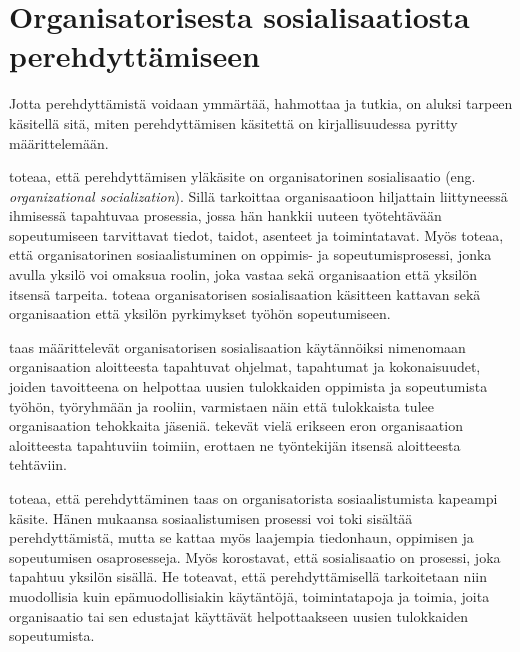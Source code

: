 \documentclass[utf8]{gradu3}
\begin{document}
\section{Organisatorisesta sosialisaatiosta perehdyttämiseen}

Jotta perehdyttämistä voidaan ymmärtää, hahmottaa ja tutkia, on aluksi tarpeen käsitellä sitä, miten perehdyttämisen käsitettä on kirjallisuudessa pyritty määrittelemään.

\textcite{wanberg-2012} toteaa, että perehdyttämisen yläkäsite on organisatorinen sosialisaatio (eng. \textit{organizational socialization}). Sillä \textcite{wanberg-2012} tarkoittaa organisaatioon hiljattain liittyneessä ihmisessä tapahtuvaa prosessia, jossa hän hankkii uuteen työtehtävään sopeutumiseen tarvittavat tiedot, taidot, asenteet ja toimintatavat. Myös \textcite{chao-2012} toteaa, että organisatorinen sosiaalistuminen on oppimis- ja sopeutumisprosessi, jonka avulla yksilö voi omaksua roolin, joka vastaa sekä organisaation että yksilön itsensä tarpeita. \textcite{chao-2012} toteaa organisatorisen sosialisaation käsitteen kattavan sekä organisaation että yksilön pyrkimykset työhön sopeutumiseen.

\textcite{saks-gruman-2012} taas määrittelevät organisatorisen sosialisaation käytännöiksi nimenomaan organisaation aloitteesta tapahtuvat ohjelmat, tapahtumat ja kokonaisuudet, joiden tavoitteena on helpottaa uusien tulokkaiden oppimista ja sopeutumista työhön, työryhmään ja rooliin, varmistaen näin että tulokkaista tulee organisaation tehokkaita jäseniä. \textcite{saks-gruman-2012} tekevät vielä erikseen eron organisaation aloitteesta tapahtuviin toimiin, erottaen ne työntekijän itsensä aloitteesta tehtäviin.

\textcite{wanberg-2012} toteaa, että perehdyttäminen taas on organisatorista sosiaalistumista kapeampi käsite. Hänen mukaansa sosiaalistumisen prosessi voi toki sisältää perehdyttämistä, mutta se kattaa myös laajempia tiedonhaun, oppimisen ja sopeutumisen osaprosesseja. Myös \textcite{klein-polin-2012} korostavat, että sosialisaatio on prosessi, joka tapahtuu yksilön sisällä. He toteavat, että perehdyttämisellä tarkoitetaan niin muodollisia kuin epämuodollisiakin käytäntöjä, toimintatapoja ja toimia, joita organisaatio tai sen edustajat käyttävät helpottaakseen uusien tulokkaiden sopeutumista.

\end{document}
